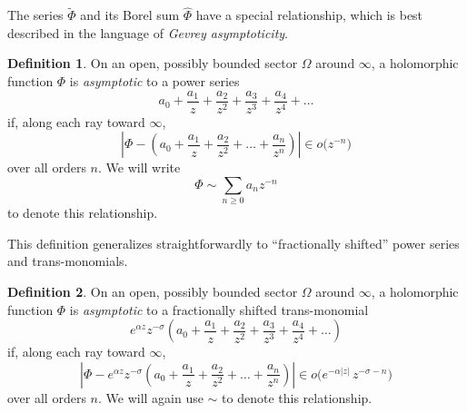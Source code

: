 \documentclass{article}
\newcommand{\series}[1]{\tilde{#1}}
\theoremstyle{definition}
\newtheorem{definition}{Definition}[section]
\theoremstyle{plain}
\begin{document}
The series $\series{\Phi}$ and its Borel sum $\hat{\Phi}$ have a special relationship, which is best described in the language of {\em Gevrey asymptoticity}.
\begin{definition}
On an open, possibly bounded sector $\Omega$ around $\infty$, a holomorphic function $\Phi$ is {\em asymptotic} to a power series
\begin{equation}\label{series:asymp-definition}
a_0 + \frac{a_1}{z} + \frac{a_2}{z^2} + \frac{a_3}{z^3} + \frac{a_4}{z^4} + \ldots
\end{equation}
if, along each ray toward $\infty$,
\[ \left|\Phi - \left(a_0 + \frac{a_1}{z} + \frac{a_2}{z^2} + \ldots + \frac{a_n}{z^n} \right) \right| \in o\big(z^{-n}\big) \]
over all orders $n$. We will write
\[ \Phi \sim \sum_{n \geq 0} a_n z^{-n} \]
to denote this relationship.
\end{definition}
This definition generalizes straightforwardly to ``fractionally shifted'' power series and trans-monomials.
\begin{definition}
On an open, possibly bounded sector $\Omega$ around $\infty$, a holomorphic function $\Phi$ is {\em asymptotic} to a fractionally shifted trans-monomial
\begin{equation}\label{trans-monom:asymp-definition}
e^{\alpha z} z^{-\sigma} \left(a_0 + \frac{a_1}{z} + \frac{a_2}{z^2} + \frac{a_3}{z^3} + \frac{a_4}{z^4} + \ldots\right)
\end{equation}
if, along each ray toward $\infty$,
\[ \left|\Phi - e^{\alpha z} z^{-\sigma} \left(a_0 + \frac{a_1}{z} + \frac{a_2}{z^2} + \ldots + \frac{a_n}{z^n} \right) \right| \in o\big(e^{-\alpha|z|}\,z^{-\sigma-n}\big) \]
over all orders $n$. We will again use $\sim$ to denote this relationship.
\end{definition}
\end{document}
